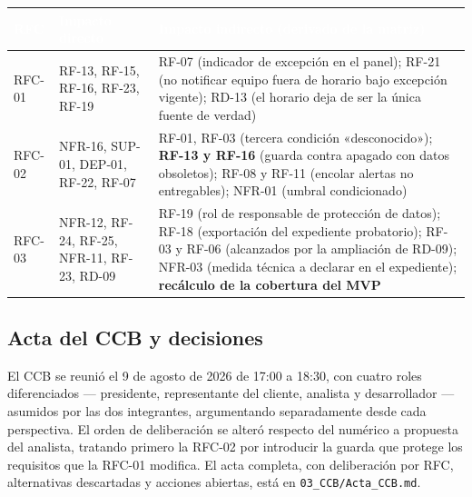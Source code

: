 \documentclass[11pt,letterpaper]{article}
\newcommand{\thead}[1]{\cellcolor{uteqverde}\textcolor{white}{\textbf{#1}}}
\begin{document}
\begin{center}
\small
\begin{tabular}{|p{1.4cm}|p{6.2cm}|p{6.6cm}|}
\hline
\thead{RFC} & \thead{Impacto directo} & \thead{Impacto indirecto (derivado de la matriz)} \\ \hline
RFC-01 & RF-13, RF-15, RF-16, RF-23, RF-19 & RF-07 (indicador de excepción en el panel); RF-21 (no notificar equipo fuera de horario bajo excepción vigente); RD-13 (el horario deja de ser la única fuente de verdad) \\ \hline
RFC-02 & NFR-16, SUP-01, DEP-01, RF-22, RF-07 & RF-01, RF-03 (tercera condición «desconocido»); \textbf{RF-13 y RF-16} (guarda contra apagado con datos obsoletos); RF-08 y RF-11 (encolar alertas no entregables); NFR-01 (umbral condicionado) \\ \hline
RFC-03 & NFR-12, RF-24, RF-25, NFR-11, RF-23, RD-09 & RF-19 (rol de responsable de protección de datos); RF-18 (exportación del expediente probatorio); RF-03 y RF-06 (alcanzados por la ampliación de RD-09); NFR-03 (medida técnica a declarar en el expediente); \textbf{recálculo de la cobertura del MVP} \\ \hline
\end{tabular}
\end{center}

\subsection{Acta del CCB y decisiones}
El CCB se reunió el 9 de agosto de 2026 de 17:00 a 18:30, con cuatro roles diferenciados --- presidente, representante del cliente, analista y desarrollador --- asumidos por las dos integrantes, argumentando separadamente desde cada perspectiva. El orden de deliberación se alteró respecto del numérico a propuesta del analista, tratando primero la RFC-02 por introducir la guarda que protege los requisitos que la RFC-01 modifica. El acta completa, con deliberación por RFC, alternativas descartadas y acciones abiertas, está en \texttt{03\_CCB/Acta\_CCB.md}.
\end{document}
